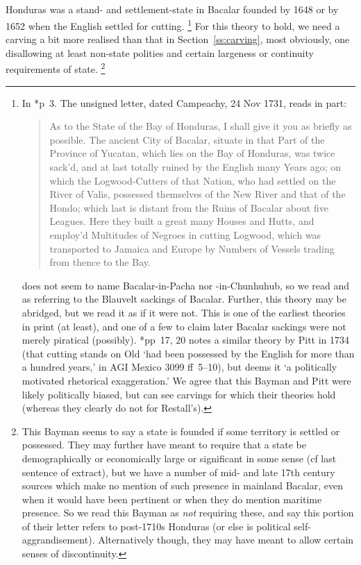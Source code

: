 	\subsection{}
	\label{ss:reads}
		Honduras was a stand- and settlement-state in Bacalar founded by 1648 or by 1652 when the English settled for cutting.%
		\footnote{In \cite{rds32}*{p~3}. The unsigned letter, dated Campeachy, 24 Nov 1731, reads in part:\begin{quote}As to the State of the Bay of Honduras, I shall give it you as briefly as possible. The ancient City of Bacalar, situate in that Part of the Province of Yucatan, which lies on the Bay of Honduras, was twice sack'd, and at last totally ruined by the English many Years ago; on which the Logwood-Cutters of that Nation, who had settled on the River of Valis, possessed themselves of the New River and that of the Hondo; which last is distant from the Ruins of Bacalar about five Leagues. Here they built a great many Houses and Hutts, and employ'd Multitudes of Negroes in cutting Logwood, which was transported to Jamaica and Europe by Numbers of Vessels trading from thence to the Bay.\end{quote}  does not seem to name Bacalar-in-Pacha nor -in-Chunhuhub, so we read  and  as referring to the Blauvelt sackings of Bacalar. Further, this theory may be abridged, but we read it as if it were not. This is one of the earliest theories in print (at least), and one of a few to claim later Bacalar sackings were not merely piratical (possibly). \cite{res19}*{pp~17, 20} notes a similar theory by Pitt in 1734 (that cutting stands on Old `had been possessed by the English for more than a hundred years,' in AGI Mexico 3099 ff~5--10), but deems it `a politically motivated rhetorical exaggeration.' We agree that this Bayman and Pitt were likely politically biased, but can see carvings for which their theories hold (whereas they clearly do not for Restall's).} %
		For this theory to hold, we need a carving a bit more realised than that in Section~\ref{ss:carving}, most obviously, one disallowing at least non-state polities and certain largeness or continuity requirements of state.%
		\footnote{This Bayman seems to say a state is founded if some territory is settled or possessed. They may further have meant to require that a state be demographically or economically large or significant in some sense (cf last sentence of extract), but we have a number of mid- and late 17th century sources which make no mention of such presence in mainland Bacalar, even when it would have been pertinent or when they do mention maritime presence. So we read this Bayman as \emph{not} requiring these, and say this portion of their letter refers to post-1710s Honduras (or else is political self-aggrandisement). Alternatively though, they may have meant to allow certain senses of discontinuity.}
